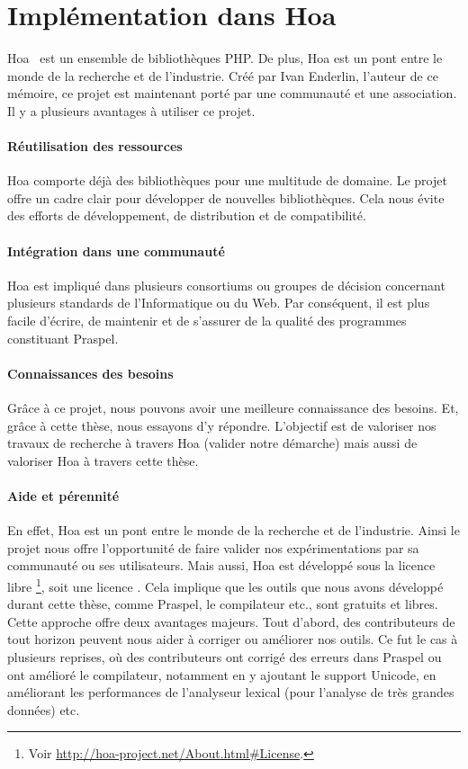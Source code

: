 \section{Implémentation dans Hoa}
\label{section:tools:hoa}

Hoa~ est un ensemble de bibliothèques PHP. De plus, Hoa est un pont
entre le monde de la recherche et de l'industrie. Créé par Ivan Enderlin,
l'auteur de ce mémoire, ce projet est maintenant porté par une communauté et une
association. Il y a plusieurs avantages à utiliser ce projet.

\paragraph{Réutilisation des ressources} Hoa comporte déjà des bibliothèques
pour une multitude de domaine. Le projet offre un cadre clair pour développer de
nouvelles bibliothèques. Cela nous évite des efforts de développement, de
distribution et de compatibilité.

\paragraph{Intégration dans une communauté} Hoa est impliqué dans plusieurs
consortiums ou groupes de décision concernant plusieurs standards de
l'Informatique ou du Web. Par conséquent, il est plus facile d'écrire, de
maintenir et de s'assurer de la qualité des programmes constituant Praspel.

\paragraph{Connaissances des besoins} Grâce à ce projet, nous pouvons avoir une
meilleure connaissance des besoins. Et, grâce à cette thèse, nous essayons d'y
répondre. L'objectif est de valoriser nos travaux de recherche à travers Hoa
(valider notre démarche) mais aussi de valoriser Hoa à travers cette thèse. 

\paragraph{Aide et pérennité} En effet, Hoa est un pont entre le monde de la
recherche et de l'industrie. Ainsi le projet nous offre l'opportunité de faire
valider nos expérimentations par sa communauté ou ses utilisateurs. Mais aussi,
Hoa est développé sous la licence libre \footnote{Voir \url{http://hoa-project.net/About.html\#License}.}, soit
une licence . Cela implique que les outils que nous avons
développé durant cette thèse, comme Praspel, le compilateur etc., sont gratuits
et libres. Cette approche offre deux avantages majeurs. Tout d'abord, des
contributeurs de tout horizon peuvent nous aider à corriger ou améliorer nos
outils. Ce fut le cas à plusieurs reprises, où des contributeurs ont corrigé des
erreurs dans Praspel ou ont amélioré le compilateur, notamment en y ajoutant le
support Unicode, en améliorant les performances de l'analyseur lexical (pour
l'analyse de très grandes données) etc.

